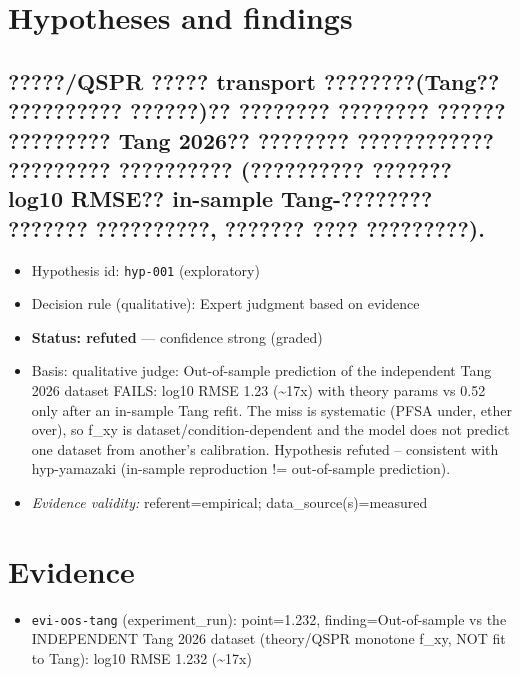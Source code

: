 \documentclass{article}
\begin{document}
\section{Hypotheses and findings}

\subsection{?????/QSPR ????? transport ????????(Tang?? ?????????? ??????)?? ???????? ???????? ?????? ????????? Tang
2026?? ???????? ???????????? ????????? ?????????? (?????????? ??????? log10 RMSE?? in-sample Tang-????????
??????? ??????????, ??????? ???? ?????????).}
\begin{itemize}
  \item Hypothesis id: \texttt{hyp-001} (exploratory)
  \item Decision rule (qualitative): Expert judgment based on evidence
  \item \textbf{Status: refuted} --- confidence strong (graded)
  \item Basis: qualitative judge: Out-of-sample prediction of the independent Tang 2026 dataset FAILS: log10 RMSE 1.23 (\textasciitilde{}17x) with theory params vs 0.52 only after an in-sample Tang refit. The miss is systematic (PFSA under, ether over), so f\_xy is dataset/condition-dependent and the model does not predict one dataset from another's calibration. Hypothesis refuted -- consistent with hyp-yamazaki (in-sample reproduction != out-of-sample prediction).
  \item \textit{Evidence validity:} referent=empirical; data\_source(s)=measured
\end{itemize}

\section{Evidence}
\begin{itemize}
  \item \texttt{evi-oos-tang} (experiment\_run): point=1.232, finding=Out-of-sample vs the INDEPENDENT Tang 2026 dataset (theory/QSPR monotone f\_xy, NOT fit to Tang): log10 RMSE 1.232 (\textasciitilde{}17x)
\end{itemize}
\end{document}
